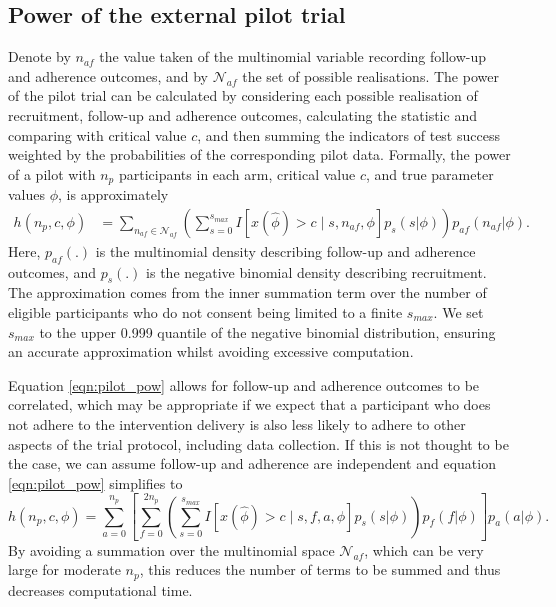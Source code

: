 \documentclass[AMA,STIX1COL]{WileyNJD-v2}
\begin{document}
\subsection{Power of the external pilot trial}

Denote by $n_{af}$ the value taken of the multinomial variable recording follow-up and adherence outcomes, and by $\mathcal{N}_{af}$ the set of possible realisations. The power of the pilot trial can be calculated by considering each possible realisation of recruitment, follow-up and adherence outcomes, calculating the statistic and comparing with critical value $c$, and then summing the indicators of test success weighted by the probabilities of the corresponding pilot data. Formally, the power of a pilot with $n_p$ participants in each arm, critical value $c$, and true parameter values $\phi$, is approximately
\begin{align}\label{eqn:pilot_pow}
h(n_p, c, \phi) &= \sum_{n_{af} \in \mathcal{N}_{af}} \left( \sum_{s = 0}^{s_{max}} 
I \left[ x(\hat{\phi}) > c \mid  s, n_{af}, \phi \right] p_{s}(s | \phi) \right)     
p_{af}(n_{af} |\phi).
\end{align}
Here, $p_{af}(.)$ is the multinomial density describing follow-up and adherence outcomes, and $p_{s}(.)$ is the negative binomial density describing recruitment. The approximation comes from the inner summation term over the number of eligible participants who do not consent being limited to a finite $s_{max}$. We set  $s_{max}$ to the upper 0.999 quantile of the negative binomial distribution, ensuring an accurate approximation whilst avoiding excessive computation.

Equation \ref{eqn:pilot_pow} allows for follow-up and adherence outcomes to be correlated, which may be appropriate if we expect that a participant who does not adhere to the intervention delivery is also less likely to adhere to other aspects of the trial protocol, including data collection. If this is not thought to be the case, we can assume follow-up and adherence are independent and equation \ref{eqn:pilot_pow} simplifies to
\begin{equation*}
h(n_p, c, \phi) = \sum_{a=0}^{n_p} \left[  \sum_{f=0}^{2n_p} \left( \sum_{s = 0}^{s_{max}} 
I \left[ x(\hat{\phi}) > c \mid  s, f, a, \phi \right] p_{s}(s | \phi) \right) p_{f}(f |\phi)  \right] p_a(a | \phi).
\end{equation*}
By avoiding a summation over the multinomial space $\mathcal{N}_{af}$, which can be very large for moderate $n_p$, this reduces the number of terms to be summed and thus decreases computational time. 
\end{document}
